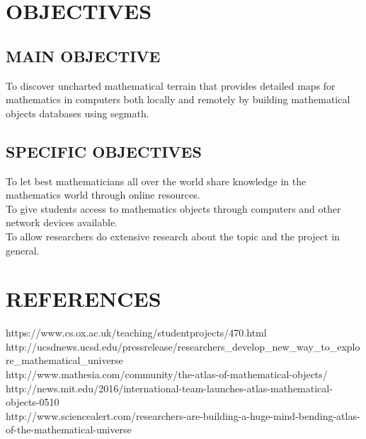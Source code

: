 \documentclass{article}
\begin{document}
\section{OBJECTIVES}

\subsection{MAIN OBJECTIVE}
To discover uncharted mathematical terrain that provides detailed maps for mathematics in computers both locally and remotely by building mathematical objects databases using segmath.\\

\subsection{SPECIFIC OBJECTIVES}
To let best mathematicians all over the world share knowledge in the mathematics world through online resources.\\ 
To give students access to mathematics objects through computers and other network devices available.\\
To allow researchers do extensive research about the topic and the project in general.\\

\section{REFERENCES}\label{sec:intro} 
https://www.cs.ox.ac.uk/teaching/studentprojects/470.html  \\
http://ucsdnews.ucsd.edu/pressrelease/researchers_develop_new_way_to_explore_mathematical_universe \\
http://www.mathesia.com/community/the-atlas-of-mathematical-objects/ \\
http://news.mit.edu/2016/international-team-launches-atlas-mathematical-objects-0510 \\
http://www.sciencealert.com/researchers-are-building-a-huge-mind-bending-atlas-of-the-mathematical-universe \\
\end{document}
